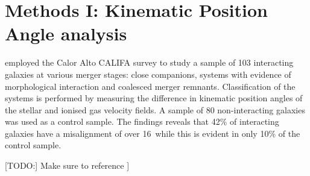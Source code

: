 \section{Methods I: Kinematic Position Angle analysis}
\label{sec:kinematics}

\citet{2015A&A...582A..21B} employed the Calor Alto CALIFA survey to study a sample of 103 interacting galaxies at various merger stages: close companions, systems with evidence of morphological interaction and coalesced merger remnants. Classification of the systems is performed by measuring the difference in kinematic position angles of the stellar and ionised gas velocity fields. A sample of 80 non-interacting galaxies was used as a control sample. The findings reveals that 42\% of interacting galaxies have a misalignment of over 16\textdegree\ while this is evident in only 10\% of the control sample.

[TODO:] Make sure to reference \citet{2019MNRAS.483..172D}]
